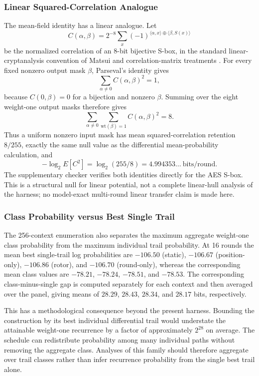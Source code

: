 \documentclass[cryptography,article,submit,oneauthor]{Definitions/mdpi}
\begin{document}
\subsubsection{Linear Squared-Correlation Analogue}\label{sec:3-7-linear}
The mean-field identity has a linear analogue. Let
\[
C(\alpha,\beta)=2^{-8}\sum_x(-1)^{\langle\alpha,x\rangle\oplus\langle\beta,S(x)\rangle}
\]
be the normalized correlation of an 8-bit bijective S-box, in the standard linear-cryptanalysis convention of Matsui and correlation-matrix treatments \cite{ref56,ref5}. For every fixed nonzero output mask $\beta$, Parseval's identity gives
\[
\sum_{\alpha\ne0} C(\alpha,\beta)^2=1,
\]
because $C(0,\beta)=0$ for a bijection and nonzero $\beta$. Summing over the eight weight-one output masks therefore gives
\[
\sum_{\alpha\ne0}\sum_{\mathrm{wt}(\beta)=1} C(\alpha,\beta)^2=8.
\]
Thus a uniform nonzero input mask has mean squared-correlation retention $8/255$, exactly the same null value as the differential mean-probability calculation, and
\[
-\log_2 E[C^2]=\log_2(255/8)=4.994353\ldots\ \text{bits/round}.
\]
The supplementary checker verifies both identities directly for the AES S-box. This is a structural null for linear potential, not a complete linear-hull analysis of the harness; no model-exact multi-round linear transfer claim is made here.

\subsubsection{Class Probability versus Best Single Trail}\label{sec:3-7-3}

The 256-context enumeration also separates the maximum aggregate weight-one class probability from the maximum individual trail probability. At 16 rounds the mean best single-trail log probabilities are $-106.50$ (static), $-106.67$ (position-only), $-106.86$ (rotor), and $-106.70$ (round-only), whereas the corresponding mean class values are $-78.21$, $-78.24$, $-78.51$, and $-78.53$. The corresponding class-minus-single gap is computed separately for each context and then averaged over the panel, giving means of $28.29$, $28.43$, $28.34$, and $28.17$ bits, respectively.

This has a methodological consequence beyond the present harness. Bounding the construction by its best individual differential trail would understate the attainable weight-one recurrence by a factor of approximately $2^{28}$ on average. The schedule can redistribute probability among many individual paths without removing the aggregate class. Analyses of this family should therefore aggregate over trail classes rather than infer recurrence probability from the single best trail alone.
\end{document}
